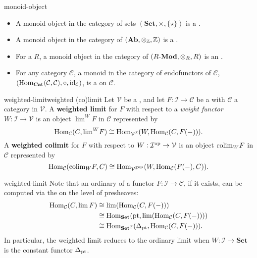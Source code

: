 \begin{example}{monoid-object}
    \begin{itemize}
        \item A monoid object in the category of sets $(\textbf{Set}, \times, \{ \star \})$ is a .
        \item A monoid object in the category of  $(\textbf{Ab}, \otimes_{\mathbb{Z}}, \mathbb{Z})$ is a .
        \item For a  $R$, a monoid object in the category of  $(R\textup{-}\textbf{Mod}, \otimes_R, R)$ is an .
        \item For any category $\mathcal{C}$, a monoid in the category of endofunctors of $\mathcal{C}$, $(\operatorname{Hom}_\textbf{Cat}(\mathcal{C}, \mathcal{C}), \circ, \textup{id}_\mathcal{C})$, is a  on $\mathcal{C}$.
    \end{itemize}
\end{example}

\begin{topic}{weighted-limit}{weighted (co)limit}
    Let $\mathcal{V}$ be a , and let $F : \mathcal{I} \to \mathcal{C}$ be a  with $\mathcal{C}$ a category  in $\mathcal{V}$. A \textbf{weighted limit} for $F$ with respect to a \textit{weight functor} $W : \mathcal{I} \to \mathcal{V}$ is an object ${\lim}^W F$ in $\mathcal{C}$ represented by
    \[ \operatorname{Hom}_\mathcal{C}(C, {\lim}^W F) \cong \operatorname{Hom}_{\mathcal{V}^\mathcal{I}}(W, \operatorname{Hom}_\mathcal{C}(C, F(-))) . \]
    A \textbf{weighted colimit} for $F$ with respect to $W : \mathcal{I}^\textup{op} \to \mathcal{V}$ is an object ${\operatorname*{colim}}_W F$ in $\mathcal{C}$ represented by
    \[ \operatorname{Hom}_\mathcal{C}({\operatorname*{colim}}_W F, C) \cong \operatorname{Hom}_{\mathcal{V}^{\mathcal{I}^\textup{op}}}(W, \operatorname{Hom}_\mathcal{C}(F(-), C)) . \]
\end{topic}

\begin{example}{weighted-limit}
    Note that an ordinary  of a functor $F : \mathcal{I} \to \mathcal{C}$, if it exists, can be computed via the  on the level of presheaves:
    \[ \begin{aligned} \operatorname{Hom}_\mathcal{C}(C, \lim F) &\cong \lim (\operatorname{Hom}_\mathcal{C}(C, F(-))) \\ &\cong \operatorname{Hom}_\textbf{Set}(\textup{pt}, \lim (\operatorname{Hom}_\mathcal{C}(C, F(-)))) \\ &\cong \operatorname{Hom}_{\textbf{Set}^\mathcal{I}}(\Delta_{\textup{pt}}, \operatorname{Hom}_\mathcal{C}(C, F(-))) . \end{aligned} \]
    In particular, the weighted limit reduces to the ordinary limit when $W : \mathcal{I} \to \textbf{Set}$ is the constant functor $\Delta_\textup{pt}$.
\end{example}

